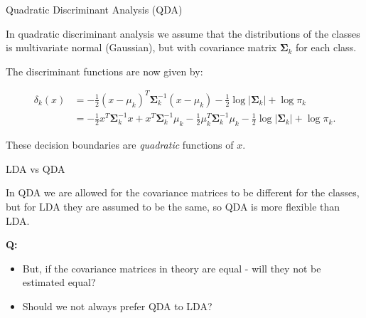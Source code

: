 \documentclass[10pt,ignorenonframetext,]{beamer}
\providecommand{\tightlist}{%
  \setlength{\itemsep}{0pt}\setlength{\parskip}{0pt}}
\begin{document}
\begin{frame}

\begin{block}{Quadratic Discriminant Analysis (QDA)}

In quadratic discriminant analysis we assume that the distributions of
the classes is multivariate normal (Gaussian), but with covariance
matrix \(\boldsymbol{\Sigma}_k\) for each class.

The discriminant functions are now given by:

\begin{align*} \delta_k(x) &= -\frac{1}{2}(x-\mu_k)^T \boldsymbol{\Sigma}_k^{-1}(x-\mu_k)-\frac{1}{2}\log |\boldsymbol{\Sigma}_k| + \log \pi_k \\ &= -\frac{1}{2} x^T \boldsymbol{\Sigma}_k^{-1}x + x^T \boldsymbol{\Sigma}_k^{-1}\mu_k - \frac{1}{2} \mu_k^T \boldsymbol{\Sigma}_k^{-1}\mu_k - \frac{1}{2}\log |\boldsymbol{\Sigma}_k | + \log \pi_k.\end{align*}

These decision boundaries are \emph{quadratic} functions of \(x\).

\end{block}

\end{frame}

\begin{frame}

\begin{block}{LDA vs QDA}

In QDA we are allowed for the covariance matrices to be different for
the classes, but for LDA they are assumed to be the same, so QDA is more
flexible than LDA.

\textbf{Q:}

\begin{itemize}
\tightlist
\item
  But, if the covariance matrices in theory are equal - will they not be
  estimated equal?
\item
  Should we not always prefer QDA to LDA?
\end{itemize}

\end{block}

\end{frame}
\end{document}
